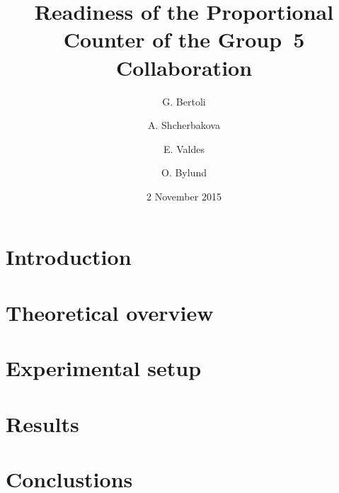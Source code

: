 \documentclass[a4paper, 10pt, notitlepage]{article}
\author{G. Bertoli \and A. Shcherbakova \and E. Valdes \and O. Bylund}
\title{Readiness of the Proportional Counter of the Group~5 Collaboration}
\date{2 November 2015}
\begin{document}
\maketitle

\begin{abstract}
  
\end{abstract}

\section{Introduction}
\label{sec:intro}


\section{Theoretical overview}
\label{sec:theory}


\section{Experimental setup}
\label{sec:setup}


\section{Results}
\label{sec:results}


\section{Conclustions}
\label{sec:conclusions}


\printbibliography
\end{document}
